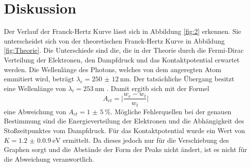 \section{Diskussion}
\label{sec:Diskussion}

Der Verlauf der Franck-Hertz Kurve lässt sich in Abbildung \ref{fig:2} erkennen.
Sie unterscheidet sich von der theoretischen Franck-Hertz Kurve in Abbildung \ref{fig:Theorie}.
Die Unterschiede sind die, die in der Theorie durch die Fermi-Dirac Verteilung der Elektronen, den Dampfdruck und das Kontaktpotential erwartet werden.
Die Wellenlänge des Photons, welches von dem angeregten Atom emmitiert wird, beträgt $\lambda_e=\qty{250(12)}{\nano\meter}$.
Der tatsächliche Übergang besitzt eine Wellenlänge von $\lambda_t=\qty{253}{\nano\meter}$ \cite{HG}.
Damit ergitb sich mit der Formel 
\begin{equation}
    A_{et}=\Biggl|\frac{w_e-w_t}{w_t}\Biggr|
    \label{eqn:Abweichung}
\end{equation}
eine Abweichung von $A_{et}=\qty{1(5)}{\percent}$.
Mögliche Fehlerquellen bei der genauen Bestimmung sind die Energieverteilung der Elektronen und die Abhängigkeit des Stoßzeitpunktes vom Dampfdruck.
Für das Kontaktpotential wurde ein Wert von $K=\qty{1.2(0.09)}{\electronvolt}$ ermittelt.
Da dieses jedoch nur für die Verschiebung des Graphen sorgt und die Abstände der Form der Peaks nicht ändert, ist es nicht für die Abweichung veranwortlich.
